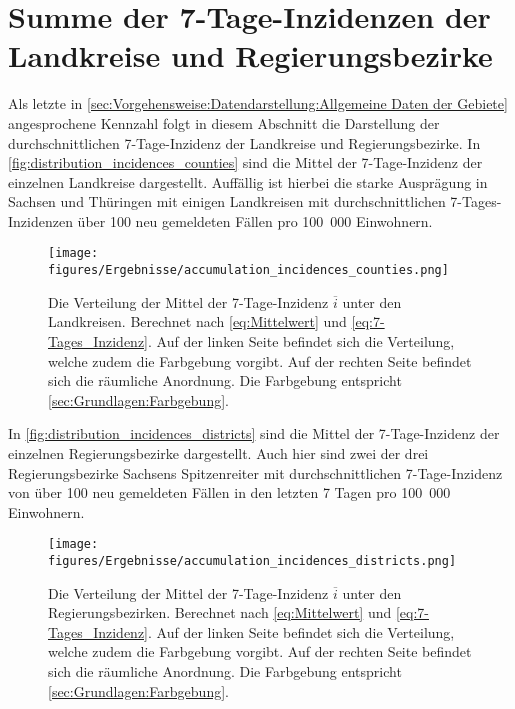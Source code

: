 \newpage
\section{Summe der 7-Tage-Inzidenzen der Landkreise und Regierungsbezirke}
Als letzte in \autoref{sec:Vorgehensweise:Datendarstellung:Allgemeine Daten der Gebiete} angesprochene Kennzahl folgt in diesem Abschnitt die Darstellung der durchschnittlichen 7-Tage-Inzidenz der Landkreise und Regierungsbezirke.
In \autoref{fig:distribution_incidences_counties} sind die Mittel der 7-Tage-Inzidenz der einzelnen Landkreise dargestellt. Auffällig ist hierbei die starke Ausprägung in Sachsen und Thüringen mit einigen Landkreisen mit durchschnittlichen 7-Tages-Inzidenzen über 100 neu gemeldeten Fällen pro 100~000 Einwohnern.

\begin{figure}[H]
    \centering
    \texttt{[image: figures/Ergebnisse/accumulation\_incidences\_counties.png]}
    \caption{Die Verteilung der Mittel der 7-Tage-Inzidenz $\overline{i}$ unter den Landkreisen. Berechnet nach \autoref{eq:Mittelwert} und \autoref{eq:7-Tages_Inzidenz}.
    Auf der linken Seite befindet sich die Verteilung, welche zudem die Farbgebung vorgibt. Auf der rechten Seite befindet sich die räumliche Anordnung. Die Farbgebung entspricht \autoref{sec:Grundlagen:Farbgebung}.}
    \label{fig:distribution_incidences_counties}
\end{figure}
\newpage
In \autoref{fig:distribution_incidences_districts} sind die Mittel der 7-Tage-Inzidenz der einzelnen Regierungsbezirke dargestellt.
Auch hier sind zwei der drei Regierungsbezirke Sachsens Spitzenreiter mit durchschnittlichen 7-Tage-Inzidenz von über 100 neu gemeldeten Fällen in den letzten 7 Tagen pro 100~000 Einwohnern.

\begin{figure}[H]
    \centering
    \texttt{[image: figures/Ergebnisse/accumulation\_incidences\_districts.png]}
    \caption{Die Verteilung der Mittel der 7-Tage-Inzidenz $\overline{i}$ unter den Regierungsbezirken. Berechnet nach \autoref{eq:Mittelwert} und \autoref{eq:7-Tages_Inzidenz}.
    Auf der linken Seite befindet sich die Verteilung, welche zudem die Farbgebung vorgibt. Auf der rechten Seite befindet sich die räumliche Anordnung. Die Farbgebung entspricht \autoref{sec:Grundlagen:Farbgebung}.}
    \label{fig:distribution_incidences_districts}
\end{figure}